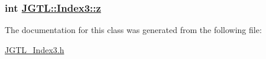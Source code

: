 \hypertarget{class_j_g_t_l_1_1_index3_bb74df1f3af23cf67605a319e27a0e55}{
\subsubsection[z]{\setlength{\rightskip}{0pt plus 5cm}int \hyperlink{class_j_g_t_l_1_1_index3_bb74df1f3af23cf67605a319e27a0e55}{JGTL::Index3::z}}}
\label{class_j_g_t_l_1_1_index3_bb74df1f3af23cf67605a319e27a0e55}




The documentation for this class was generated from the following file:\begin{CompactItemize}
\item 
\hyperlink{_j_g_t_l___index3_8h}{JGTL\_\-Index3.h}\end{CompactItemize}
